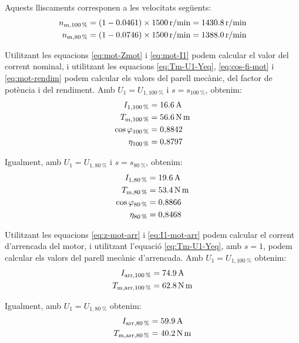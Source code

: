 \begin{exemple}
	Aquests lliscaments corresponen a les velocitats següents:
	\begin{align*}
		n_\mathrm{m,\qty{100}{\%}} &= (1-\num{0,0461})\times \qty{1500}{r/min} = \qty{1430,8}{r/min} \\
		n_\mathrm{m,\qty{80}{\%}} &= (1-\num{0,0746})\times \qty{1500}{r/min} = \qty{1388,0}{r/min}
	\end{align*}
	
	Utilitzant les equacions \eqref{eq:mot-Zmot} i \eqref{eq:mot-I1} podem calcular el valor del corrent nominal, i utilitzant les equacions \eqref{eq:Tm-U1-Yeq}, \eqref{eq:cos-fi-mot} i \eqref{eq:mot-rendim} podem calcular els valors del parell mecànic, del factor de potència i del rendiment. Amb $U_1 = U_{1,\qty{100}{\%}}$  i $s = s_{\qty{100}{\%}}$, obtenim:
	\begin{align*}
		I_{1,\qty{100}{\%}} &= \qty{16,6}{A} \\
		T_\mathrm{m,\qty{100}{\%}} &=  \qty{56,6}{N.m} \\
		\cos\varphi_{\qty{100}{\%}} &=  0{,}8842 \\
		\eta_{\qty{100}{\%}} &=  0{,}8797
	\end{align*}
	
	Igualment, amb $U_1 = U_{1,\qty{80}{\%}}$ i $s = s_{\qty{80}{\%}}$, obtenim:
	\vspace{-2mm}
	\begin{align*}
		I_{1,\qty{80}{\%}} &= \qty{19,6}{A} \\
		T_\mathrm{m,\qty{80}{\%}} &=  \qty{53,4}{N.m} \\
		\cos\varphi_{\qty{80}{\%}} &=  0{,}8866 \\
		\eta_{\qty{80}{\%}} &=  0{,}8468
	\end{align*}

	Utilitzant les equacions \eqref{eq:z-mot-arr} i \eqref{eq:I1-mot-arr} podem calcular el corrent d'arrencada del motor, i utilitzant l'equació \eqref{eq:Tm-U1-Yeq}, amb $s=1$, podem calcular els valors del parell mecànic d'arrencada. Amb $U_1 = U_{1,\qty{100}{\%}}$   obtenim:
	\vspace{-2mm}
	\begin{align*}
		I_\mathrm{arr,\qty{100}{\%}} &=  \qty{74,9}{A} \\
		T_\mathrm{m,arr,\qty{100}{\%}} &=  \qty{62,8}{N.m} 
	\end{align*}
	
	Igualment, amb $U_1 = U_{1,\qty{80}{\%}}$ obtenim:
	\vspace{-2mm}
	\begin{align*}
		I_\mathrm{arr,\qty{80}{\%}} &=  \qty{59,9}{A} \\
		T_\mathrm{m,arr,\qty{80}{\%}} &=  \qty{40,2}{N.m} 
	\end{align*}
	

\end{exemple}
